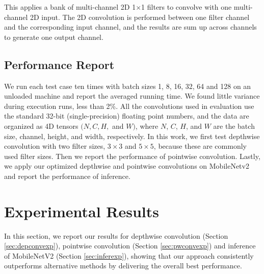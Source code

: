  This applies a bank of multi-channel 2D 1$\times$1 filters to convolve with one multi-channel 2D input. 
The 2D convolution is performed between one filter channel and the corresponding input channel, and the results are sum up across channels to generate one output channel.


\subsection{Performance Report}
We run each test case ten times with batch sizes 1, 8, 16, 32, 64 and 128 on an unloaded machine and report the averaged running time. 
We found little variance during execution runs, less than 2\%.  
All the convolutions used in evaluation use the standard 32-bit (single-precision) floating point numbers, and the data are organized as 4D tensors $(N,C,H,$ and $W)$, where $N$, $C$, $H$, and $W$ are the batch size, channel, height, and width, respectively. 
In this work, we first test depthwise convolution with two filter sizes, $3 \times 3$ and $5 \times 5$, because these are commonly used filter sizes. 
Then we report the performance of pointwise convolution. 
Lastly, we apply our optimized depthwise and pointwise convolutions on MobileNetv2 and report the performance of inference.
%

\section{Experimental Results}
\label{exp} In this section, we report our results for depthwise convolution (Section \ref{sec:depconvexp}), pointwise convolution (Section \ref{sec:pwconvexp}) and inference of MobileNetV2 (Section \ref{sec:inferexp}), showing that our approach consistently outperforms alternative methods by delivering the overall best performance.



